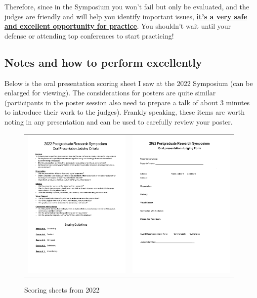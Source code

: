 Therefore, since in the Symposium you won't fail but only be evaluated, and the judges are friendly and will help you identify important issues, \uline{\textbf{it's a very safe and excellent opportunity for practice}}. You shouldn't wait until your defense or attending top conferences to start practicing!

\subsection{Notes and how to perform excellently}

Below is the oral presentation scoring sheet I saw at the 2022 Symposium (can be enlarged for viewing). The considerations for posters are quite similar (participants in the poster session also need to prepare a talk of about 3 minutes to introduce their work to the judges). Frankly speaking, these items are worth noting in any presentation and can be used to carefully review your poster.

\begin{figure}[H]
    \caption{Scoring sheets from 2022}
    \centering
    \begin{tabular}{rl}
        \includegraphics[width=0.5\columnwidth]{author-folder/Kai.Wu/2022_XPGRS_oral_judging_criteria.pdf} & 
        \includegraphics[width=0.5\columnwidth]{author-folder/Kai.Wu/2022_XPGRS_oral_judging_form.pdf} 
    \end{tabular}
\end{figure}

